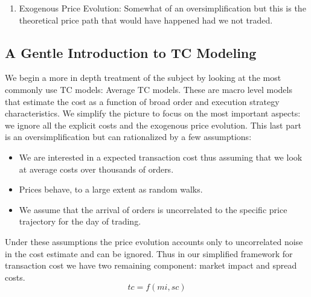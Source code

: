 \begin{enumerate}


\item Exogenous Price Evolution: Somewhat of an oversimplification but this is the theoretical price path that would have happened had we not traded.
\end{enumerate}

\subsection{A Gentle Introduction to TC Modeling}
We begin a more in depth treatment of the subject by looking at the most commonly use TC models: Average TC models. These are macro level models that estimate the cost as a function of broad order and execution strategy characteristics. We simplify the picture to focus on the most important aspects: we ignore all the explicit costs and the exogenous price evolution. This last part is an oversimplification but can rationalized by a few assumptions:
\begin{itemize}
 \item We are interested in a expected transaction cost thus assuming that we look at average costs over thousands of orders.
 \item Prices behave, to a large extent as random walks.
 \item We assume that the arrival of orders is uncorrelated to the specific price trajectory for the day of trading. 
 \end{itemize} 

Under these assumptions the price evolution accounts only to uncorrelated noise in the cost estimate and can be ignored. Thus in our simplified framework for transaction cost we have two remaining component: market impact and spread costs. 
\begin{equation}\label{eq:tc_1}
		tc = f(mi,sc)
\end{equation}

